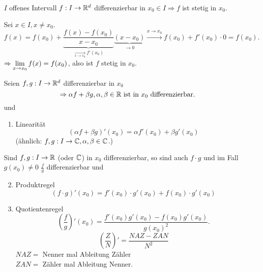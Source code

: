 \documentclass[../ana1.tex]{subfiles}
\begin{document}
\begin{satz}
    \( I \) offenes Intervall \( f : I \rightarrow \mathbb{R}^d \) 
    differenzierbar in \( x_0 \in I \Rightarrow f \) ist stetig 
    in \(x_0\).
\end{satz}
\begin{bew}
    Sei \( x\in I, x \neq x_0 \).
    \[ f(x) = f(x_0) + \underbrace{
    \frac{f(x) - f(x_0)}{x - x_0} }_{
        \underset{x\rightarrow x_0}{\longrightarrow} f'(x_0)
    } \underbrace{(x-x_0)}_{\rightarrow 0} 
    \overset{x\rightarrow x_0 }{\longrightarrow} 
    f(x_0) + f'(x_0) \cdot 0 = f(x_0). \]
    \( \Rightarrow \lim\limits_{x\rightarrow x_0} f(x) = f(x_0) \), also ist
    \( f \) stetig in \( x_0 \).
\end{bew}
\begin{satz}[Differentiationsregeln]
    Seien \( f, g: I \rightarrow \mathbb{R}^d \) differenzierbar in \(x_0\)
    \[ \Rightarrow \alpha f + \beta g, \alpha, \beta \in \mathbb{R} 
    \text{ ist in } x_0 \text{ differenzierbar.} \]
    und 
    \begin{enumerate}
        \item Linearität 
        \[ (\alpha f + \beta g)'(x_0) = \alpha f'(x_0) 
        + \beta g'(x_0) \]
        (ähnlich: \( f, g: I \rightarrow \mathbb{C}, \alpha, \beta \in \mathbb{C} \).)
    \end{enumerate}
    Sind \( f, g: I \rightarrow \mathbb{R} \) (oder \( \mathbb{C} \)) in \(x_0\)
    differenzierbar, so sind auch \( f\cdot g \) und im Fall 
    \( g(x_0) \neq 0 \) \( \frac{f}{g} \) differenzierbar und 
    \begin{enumerate}
        \setcounter{enumi}{1}
        \item Produktregel
        \[ (f \cdot g)'(x_0) = f'(x_0) \cdot g'(x_0) 
        + f(x_0) \cdot g'(x_0) \]
        \item Quotientenregel
        \[ \left( \frac{f}{g} \right)'(x_0) 
        = \frac{ f'(x_0) g'(x_0) - f(x_0) g'(x_0) }{ {g(x_0)}^2 }. \]
        \[ \left(\frac{Z}{N}\right)' = \frac{NAZ - ZAN}{N^2} \]
        \( NAZ = \) Nenner mal Ableitung Zähler\\
        \( ZAN = \) Zähler mal Ableitung Nenner.
    \end{enumerate}
\end{satz}
\end{document}

